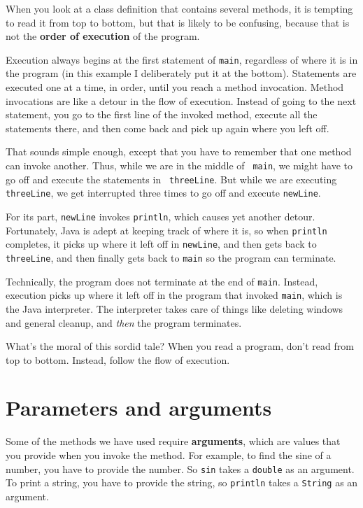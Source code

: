 \documentclass[12pt]{book}
\theoremstyle{exercise}
\begin{document}
When you look at a class definition that contains several methods, it
is tempting to read it from top to bottom, but that is likely to be
confusing, because that is not the {\bf order of execution} of the
program.

Execution always begins at the first statement of {\tt main},
regardless of where it is in the program (in this example I deliberately
put it at the bottom).  Statements are executed one at a time, in
order, until you reach a method invocation.  Method invocations are
like a detour in the flow of execution.  Instead of going to the next
statement, you go to the first line of the invoked method, execute all
the statements there, and then come back and pick up again where you
left off.

That sounds simple enough, except that you have to remember that one
method can invoke another.  Thus, while we are in the middle of {\tt
main}, we might have to go off and execute the statements in {\tt
threeLine}.  But while we are executing {\tt threeLine}, we get
interrupted three times to go off and execute {\tt newLine}.

For its part, {\tt newLine} invokes
{\tt println}, which causes yet another detour.  Fortunately,
Java is adept at keeping track of where it is, so when
{\tt println} completes, it picks up where it left off in
{\tt newLine}, and then gets back to {\tt threeLine}, and then
finally gets back to {\tt main} so the program can terminate.

Technically, the program does not terminate at the
end of {\tt main}.  Instead, execution picks up where it left
off in the program that invoked {\tt main}, which is the
Java interpreter.  The interpreter takes care of things
like deleting windows and general cleanup, and {\em then}
the program terminates.

What's the moral of this sordid tale?  When you
read a program, don't read from top to bottom.  Instead,
follow the flow of execution.


\section {Parameters and arguments}

Some of the methods we have used require {\bf arguments},
which are values that you provide when you invoke the method.
For example, to find the sine of a number,
you have to provide the number.  So {\tt sin}
takes a {\tt double} as an argument.  To print a string,
you have to provide the string, so {\tt println}
takes a {\tt String} as an argument.
\end{document}
